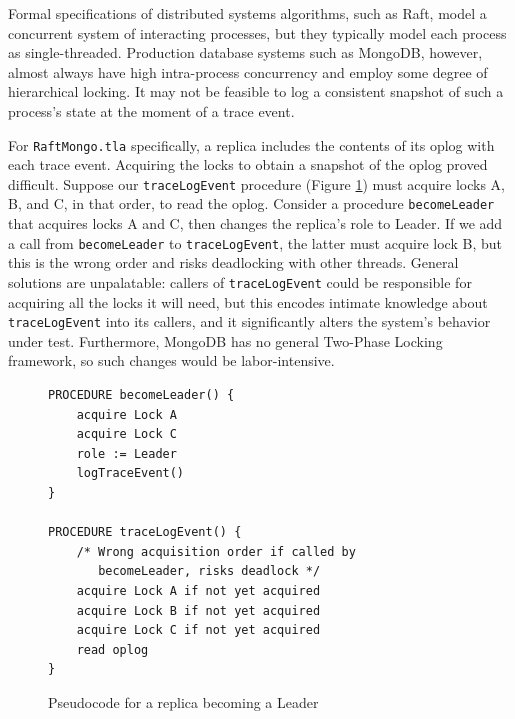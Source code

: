 \documentclass{vldb}
\begin{document}
Formal specifications of distributed systems algorithms, such as Raft, model a concurrent system of interacting processes, but they typically model each process as single-threaded. Production database systems such as MongoDB, however, almost always have high intra-process concurrency and employ some degree of hierarchical locking\cite{Gray76SharedLocks}. It may not be feasible to log a consistent snapshot of such a process's state at the moment of a trace event.


For \texttt{RaftMongo.tla} specifically, a replica includes the contents of its oplog with each trace event. Acquiring the locks to obtain a snapshot of the oplog proved difficult. Suppose our \texttt{traceLogEvent} procedure (Figure \ref{fig:state-sequence}) must acquire locks A, B, and C, in that order, to read the oplog. Consider a procedure \texttt{becomeLeader} that acquires locks A and C, then changes the replica's role to Leader. If we add a call from \texttt{becomeLeader} to \texttt{traceLogEvent}, the latter must acquire lock B, but this is the wrong order and risks deadlocking with other threads.  General solutions are unpalatable: callers of \texttt{traceLogEvent} could be responsible for acquiring all the locks it will need, but this encodes intimate knowledge about \texttt{traceLogEvent} into its callers, and it significantly alters the system's behavior under test. Furthermore, MongoDB has no general Two-Phase Locking\cite{Eswaran76TwoPhaseLocking} framework, so such changes would be labor-intensive.

\begin{figure}
\begin{verbatim}
PROCEDURE becomeLeader() {
    acquire Lock A
    acquire Lock C
    role := Leader
    logTraceEvent()
}

PROCEDURE traceLogEvent() {
    /* Wrong acquisition order if called by
       becomeLeader, risks deadlock */
    acquire Lock A if not yet acquired
    acquire Lock B if not yet acquired
    acquire Lock C if not yet acquired
    read oplog
}
\end{verbatim}
\caption{Pseudocode for a replica becoming a Leader}
\label{fig:state-sequence}
\end{figure}
\end{document}
